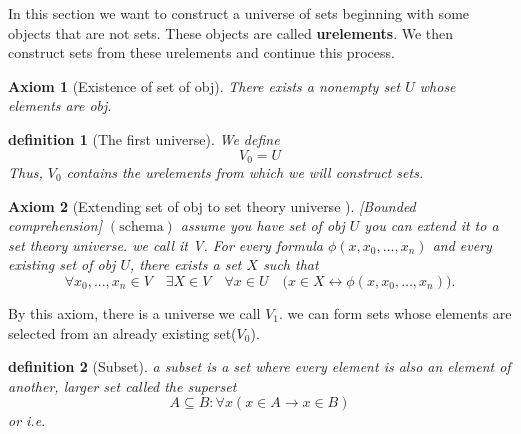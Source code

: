 \documentclass[10pt,a4paper]{book}
\newtheorem{definition}{definition}[section]
\newtheorem{axiom}{Axiom}[section]
\begin{document}
In this section we want to construct a universe of sets beginning
with some objects that are not sets. These objects are called
\textbf{urelements}. We then construct sets from these urelements
and continue this process.





\begin{axiom}[Existence of set of obj]

    There exists a nonempty set $U$ whose elements are obj.

\end{axiom}

\begin{definition}
    [The first universe]

    We define
    \[
        V_0=U
    \]
    Thus, $V_0$ contains the urelements from which we will
    construct sets.
\end{definition}



\begin{axiom}[Extending set of obj to set theory universe ]
    [Bounded comprehension] $(\mathrm{schema})$
    assume you have set of obj $U$ you can extend it to
    a set theory universe. we call it V.
    For every formula $\phi(x,x_0,\ldots,x_n)$ and every
    existing set of obj $U$, there exists a set $X$ such that
    \[
        \forall x_0 , ... , x_n \in V \quad \exists X \in V \quad \forall x \in U \quad
        \bigl(x\in X\leftrightarrow
        \phi(x,x_0,\ldots,x_n)\bigr).
    \]
\end{axiom}

By this axiom, there is a universe we call $V_1$. we can form sets whose elements are selected
from an already existing set($V_0$).




\begin{definition}
    [Subset] a subset is a set where every element is also an element of another, larger set called the superset
    \[ A \subseteq B: \forall x(x \in A \rightarrow x \in B) \]
    or i.e.
\end{definition}
\end{document}
